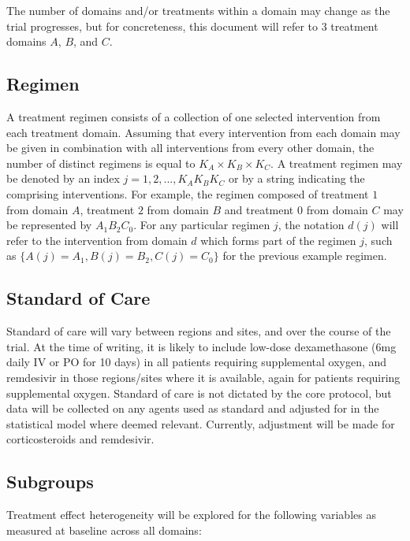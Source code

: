 \documentclass[
  11pt,
]{article}
\begin{document}
The number of domains and/or treatments within a domain may change as the trial progresses, but for concreteness, this document will refer to 3 treatment domains \(A\), \(B\), and \(C\).

\hypertarget{regimen}{%
\subsection{Regimen}\label{regimen}}

A treatment regimen consists of a collection of one selected intervention from each treatment domain.
Assuming that every intervention from each domain may be given in combination with all interventions from every other domain, the number of distinct regimens is equal to \(K_A\times K_B\times K_C\).
A treatment regimen may be denoted by an index \(j = 1,2,...,K_AK_BK_C\) or by a string indicating the comprising interventions.
For example, the regimen composed of treatment \(1\) from domain \(A\), treatment \(2\) from domain \(B\) and treatment \(0\) from domain \(C\) may be represented by \(A_1B_2C_0\).
For any particular regimen \(j\), the notation \(d(j)\) will refer to the intervention from domain \(d\) which forms part of the regimen \(j\), such as \(\{A(j)=A_1,B(j)=B_2,C(j)=C_0\}\) for the previous example regimen.

\hypertarget{standard-of-care}{%
\subsection{Standard of Care}\label{standard-of-care}}

Standard of care will vary between regions and sites, and over the course of the trial.
At the time of writing, it is likely to include low-dose dexamethasone (6mg daily IV or PO for 10 days) in all patients requiring supplemental oxygen, and remdesivir in those regions/sites where it is available, again for patients requiring supplemental oxygen.
Standard of care is not dictated by the core protocol, but data will be collected on any agents used as standard and adjusted for in the statistical model where deemed relevant.
Currently, adjustment will be made for corticosteroids and remdesivir.

\hypertarget{subgroups}{%
\subsection{Subgroups}\label{subgroups}}

Treatment effect heterogeneity will be explored for the following variables as measured at baseline across all domains:
\end{document}
